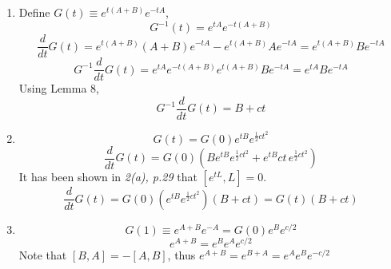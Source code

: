 \begin{sol}
\begin{enumerate}[label=\textbf{(\alph*)}]
\item
Define $G(t)\equiv e^{t(A+B)}e^{-tA}$,
\begin{equation}
	G^{-1}(t)=e^{tA}e^{-t(A+B)}
\end{equation}
\begin{equation}
	\frac{d}{dt}G(t)=e^{t(A+B)}(A+B)e^{-tA}-e^{t(A+B)}Ae^{-tA}=e^{t(A+B)}Be^{-tA}
\end{equation}
\begin{equation}
	G^{-1}\frac{d}{dt}G(t)=e^{tA}e^{-t(A+B)}e^{t(A+B)}Be^{-tA}=e^{tA}Be^{-tA}
\end{equation}
Using Lemma 8, 
\begin{equation}
	G^{-1}\frac{d}{dt}G(t)=B+ct
\end{equation} 
\item
\begin{equation}
	G(t)=G(0)e^{tB}e^{\frac{1}{2}ct^2}
\end{equation}
\begin{equation}
	\frac{d}{dt}G(t)=G(0)(Be^{tB}e^{\frac{1}{2}ct^2}+e^{tB}ct\,e^{\frac{1}{2}ct^2})
\end{equation}
It has been shown in \textit{2(a), p.29} that $[e^{tL},L]=0$. 
\begin{equation}
	\frac{d}{dt}G(t)=G(0)(e^{tB}e^{\frac{1}{2}ct^2})(B+ct)=G(t)(B+ct)
\end{equation}
\item
\begin{equation}
	G(1)\equiv e^{A+B}e^{-A}=G(0)e^Be^{c/2}
\end{equation}
\begin{equation}
	e^{A+B}=e^Be^Ae^{c/2}
\end{equation} 
Note that $[B,A]=-[A,B]$, thus $e^{A+B}=e^{B+A}=e^Ae^Be^{-c/2}$
\end{enumerate}
\end{sol}